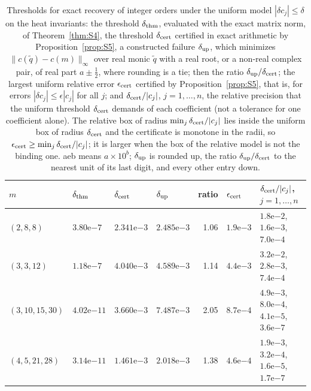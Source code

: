 \documentclass[pdflatex,sn-mathphys-num]{sn-jnl}
\theoremstyle{thmstyleone}%
\theoremstyle{thmstylethree}%
\begin{document}
\begin{table}[ht]
\caption{Thresholds for exact recovery of integer orders under the uniform model $|\delta c_j|\le\delta$ on the heat invariants: the threshold $\delta_{\rm thm}$, evaluated with the exact matrix norm, of Theorem~\ref{thm:S4}, the threshold $\delta_{\rm cert}$ certified in exact arithmetic by Proposition~\ref{prop:S5}, a constructed failure $\delta_{\rm up}$, which minimizes $\|c(\tilde q)-c(m)\|_\infty$ over real monic $\tilde q$ with a real root, or a non-real complex pair, of real part $a\pm\frac12$, where rounding is a tie; then the ratio $\delta_{\rm up}/\delta_{\rm cert}$; the largest uniform relative error $\epsilon_{\rm cert}$ certified by Proposition~\ref{prop:S5}, that is, for errors $|\delta c_j|\le\epsilon|c_j|$ for all $j$; and $\delta_{\rm cert}/|c_j|$, $j=1,\dots,n$, the relative precision that the uniform threshold $\delta_{\rm cert}$ demands of each coefficient (not a tolerance for one coefficient alone). The relative box of radius $\min_j\delta_{\rm cert}/|c_j|$ lies inside the uniform box of radius $\delta_{\rm cert}$ and the certificate is monotone in the radii, so $\epsilon_{\rm cert}\ge\min_j\delta_{\rm cert}/|c_j|$; it is larger when the box of the relative model is not the binding one. aeb means $a\times10^b$; $\delta_{\rm up}$ is rounded up, the ratio $\delta_{\rm up}/\delta_{\rm cert}$ to the nearest unit of its last digit, and every other entry down.}\label{tab:thresholdsfull}
\centering\footnotesize\setlength{\tabcolsep}{4pt}
\begin{tabular}{@{}llllrl>{\raggedright\arraybackslash}p{30mm}@{}}
\toprule
$m$ & $\delta_{\rm thm}$ & $\delta_{\rm cert}$ & $\delta_{\rm up}$ & ratio & $\epsilon_{\rm cert}$ & $\delta_{\rm cert}/|c_j|$, $j=1,\dots,n$\\
\midrule
$(2,8,8)$ & $3.80\text{e}{-7}$ & $2.341\text{e}{-3}$ & $2.485\text{e}{-3}$ & 1.06 & $1.9\text{e}{-3}$ & $1.8\text{e}{-2}$, $1.6\text{e}{-3}$, $7.0\text{e}{-4}$ \\
$(3,3,12)$ & $1.18\text{e}{-7}$ & $4.040\text{e}{-3}$ & $4.589\text{e}{-3}$ & 1.14 & $4.4\text{e}{-3}$ & $3.2\text{e}{-2}$, $2.8\text{e}{-3}$, $7.4\text{e}{-4}$ \\
$(3,10,15,30)$ & $4.02\text{e}{-11}$ & $3.660\text{e}{-3}$ & $7.487\text{e}{-3}$ & 2.05 & $8.7\text{e}{-4}$ & $4.9\text{e}{-3}$, $8.0\text{e}{-4}$, $4.1\text{e}{-5}$, $3.6\text{e}{-7}$ \\
$(4,5,21,28)$ & $3.14\text{e}{-11}$ & $1.461\text{e}{-3}$ & $2.018\text{e}{-3}$ & 1.38 & $4.6\text{e}{-4}$ & $1.9\text{e}{-3}$, $3.2\text{e}{-4}$, $1.6\text{e}{-5}$, $1.7\text{e}{-7}$ \\

\end{tabular}
\end{table}
\end{document}
